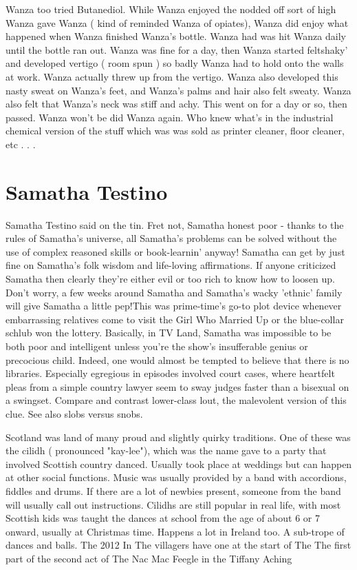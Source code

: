 \documentclass[12pt]{book}
\begin{document}
Wanza too tried Butanediol. While Wanza enjoyed the nodded off sort of high Wanza gave Wanza ( kind of reminded Wanza of opiates), Wanza did enjoy what happened when Wanza finished Wanza's bottle. Wanza had was hit Wanza daily until the bottle ran out. Wanza was fine for a day, then Wanza started feltshaky' and developed vertigo ( room spun ) so badly Wanza had to hold onto the walls at work. Wanza actually threw up from the vertigo. Wanza also developed this nasty sweat on Wanza's feet, and Wanza's palms and hair also felt sweaty. Wanza also felt that Wanza's neck was stiff and achy. This went on for a day or so, then passed. Wanza won't be did Wanza again. Who knew what's in the industrial chemical version of the stuff which was was sold as printer cleaner, floor cleaner, etc . . . 



\chapter{Samatha Testino}

Samatha Testino said on the tin. Fret not, Samatha honest poor - thanks to the rules of Samatha's universe, all Samatha's problems can be solved without the use of complex reasoned skills or book-learnin' anyway! Samatha can get by just fine on Samatha's folk wisdom and life-loving affirmations. If anyone criticized Samatha then clearly they're either evil or too rich to know how to loosen up. Don't worry, a few weeks around Samatha and Samatha's wacky 'ethnic' family will give Samatha a little pep!This was prime-time's go-to plot device whenever embarrassing relatives come to visit the Girl Who Married Up or the blue-collar schlub won the lottery. Basically, in TV Land, Samatha was impossible to be both poor and intelligent unless you're the show's insufferable genius or precocious child. Indeed, one would almost be tempted to believe that there is no libraries. Especially egregious in episodes involved court cases, where heartfelt pleas from a simple country lawyer seem to sway judges faster than a bisexual on a swingset. Compare and contrast lower-class lout, the malevolent version of this clue. See also slobs versus snobs.



Scotland was land of many proud and slightly quirky traditions. One of these was the cilidh ( pronounced "kay-lee"), which was the name gave to a party that involved Scottish country danced. Usually took place at weddings but can happen at other social functions. Music was usually provided by a band with accordions, fiddles and drums. If there are a lot of newbies present, someone from the band will usually call out instructions. Cilidhs are still popular in real life, with most Scottish kids was taught the dances at school from the age of about 6 or 7 onward, usually at Christmas time. Happens a lot in Ireland too. A sub-trope of dances and balls. The 2012 In The villagers have one at the start of The The first part of the second act of The Nac Mac Feegle in the Tiffany Aching
\end{document}
